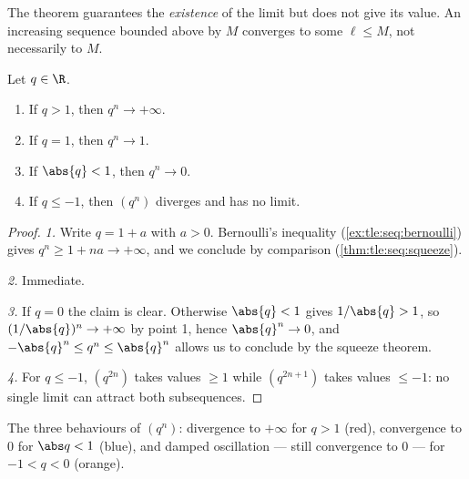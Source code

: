 \begin{remark}
The theorem guarantees the \emph{existence} of the limit but does not give
its value. An increasing sequence bounded above by $M$ converges to some
$\ell \leq M$, not necessarily to $M$.
\end{remark}

\begin{theorem}\label{thm:tle:seq:geometric}
Let $q \in \R$.
\begin{enumerate}
  \item If $q > 1$, then $q^n \to +\infty$.
  \item If $q = 1$, then $q^n \to 1$.
  \item If $\abs{q} < 1$, then $q^n \to 0$.
  \item If $q \leq -1$, then $(q^n)$ diverges and has no limit.
\end{enumerate}
\end{theorem}

\begin{proof}
\emph{1.} Write $q = 1 + a$ with $a > 0$. Bernoulli's inequality
(\cref{ex:tle:seq:bernoulli}) gives $q^n \geq 1 + na \to +\infty$, and we
conclude by comparison (\cref{thm:tle:seq:squeeze}).

\emph{2.} Immediate.

\emph{3.} If $q = 0$ the claim is clear. Otherwise $\abs{q} < 1$ gives
$1/\abs{q} > 1$, so $(1/\abs{q})^n \to +\infty$ by point 1, hence
$\abs{q}^n \to 0$, and $-\abs{q}^n \leq q^n \leq \abs{q}^n$ allows us to
conclude by the squeeze theorem.

\emph{4.} For $q \leq -1$, $(q^{2n})$ takes values $\geq 1$ while
$(q^{2n+1})$ takes values $\leq -1$: no single limit can attract both
subsequences.
\end{proof}

\begin{omfigure}

{\small The three behaviours of $(q^n)$: divergence to $+\infty$ for
$q > 1$ (red), convergence to $0$ for $\abs q < 1$ (blue), and damped
oscillation --- still convergence to $0$ --- for $-1 < q < 0$ (orange).}
\end{omfigure}

